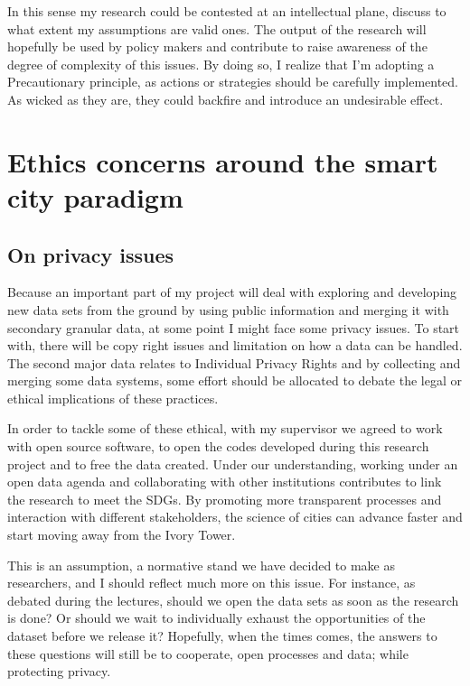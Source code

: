 In this sense my research could be contested at an intellectual plane, discuss to what extent my assumptions are valid ones. The output of the research will hopefully be used by policy makers and contribute to raise awareness of the degree of complexity of this issues. By doing so, I realize that I’m adopting a Precautionary principle, as actions or strategies should be carefully implemented. As wicked as they are, they could backfire and introduce an undesirable effect. 



\section{Ethics concerns around the smart city paradigm}
\subsection{On privacy issues}
Because an important part of my project will deal with exploring and developing new data sets from the ground by using public information and merging it with secondary granular data, at some point I might face some privacy issues.  To start with, there will be copy right issues and limitation on how a data can be handled. The second major data relates to Individual Privacy Rights and by collecting and merging some data systems, some effort should be allocated to debate the legal or ethical implications of these practices.  \par

In order to tackle some of these ethical, with my supervisor we agreed to work with open source software, to open the codes developed during this research project and to free the data created. Under our understanding, working under an open data agenda and collaborating with other institutions contributes to link the research to meet the SDGs. By promoting more transparent processes and interaction with different stakeholders, the science of cities can advance faster and start moving away from the Ivory Tower. \par

This is an assumption, a normative stand we have decided to make as researchers, and I should reflect much more on this issue. For instance, as debated during the lectures, should we open the data sets as soon as the research is done? Or should we wait to individually exhaust the opportunities of the dataset before we release it? Hopefully, when the times comes, the answers to these questions will still be to cooperate, open processes and data; while protecting privacy. \par



